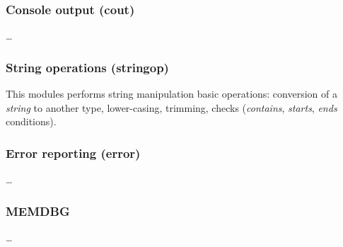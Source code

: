 \subsubsection{Console output (cout)}

\ldots

\subsubsection{String operations (stringop)}

This modules performs string manipulation basic operations: conversion of a
\emph{string} to another type, lower-casing, trimming, checks (\emph{contains},
\emph{starts}, \emph{ends} conditions).

\subsubsection{Error reporting (error)}

\ldots

\subsubsection{MEMDBG}

\ldots

